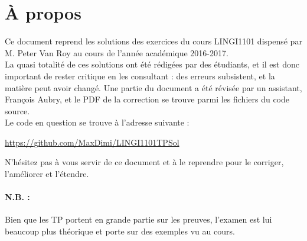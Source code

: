 \section*{À propos}
Ce document reprend les solutions des exercices du cours LINGI1101 dispensé par M. Peter Van Roy au cours de l'année académique 2016-2017.\\
La quasi totalité de ces solutions ont été rédigées par des étudiants, et il est donc important de rester critique en les consultant : des erreurs subsistent, et la matière peut avoir changé.
Une partie du document a été révisée par un assistant, François Aubry, et le PDF de la correction se trouve parmi les fichiers du code source.\\

Le code en question se trouve à l'adresse suivante :
\begin{center}
\url{https://github.com/MaxDimi/LINGI1101TPSol}\\
\end{center}

N'hésitez pas à vous servir de ce document et à le reprendre pour le corriger, l'améliorer et l'étendre.

\paragraph{\large{N.B. :}} Bien que les TP portent en grande partie sur les preuves, l'examen est lui beaucoup plus théorique et porte sur des exemples vu au cours.